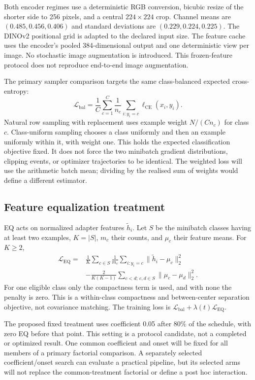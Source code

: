 \documentclass[conference]{IEEEtran}
\newcommand{\CE}{\mathrm{CE}}
\newcommand{\EQ}{\mathrm{EQ}}
\begin{document}
Both encoder regimes use a deterministic RGB conversion, bicubic resize of the shorter side to 256 pixels, and a central $224\times224$ crop. Channel means are $(0.485,0.456,0.406)$ and standard deviations are $(0.229,0.224,0.225)$. The DINOv2 positional grid is adapted to the declared input size. The feature cache uses the encoder's pooled 384-dimensional output and one deterministic view per image. No stochastic image augmentation is introduced. This frozen-feature protocol does not reproduce end-to-end image augmentation.

The primary sampler comparison targets the same class-balanced expected cross-entropy:
\begin{equation}
\mathcal L_{\mathrm{bal}}=\frac{1}{C}\sum_{c=1}^{C}\frac{1}{n_c}\sum_{i:y_i=c}\ell_{\CE}(x_i,y_i).
\label{eq:balanced}
\end{equation}
Natural row sampling with replacement uses example weight $N/(Cn_c)$ for class $c$. Class-uniform sampling chooses a class uniformly and then an example uniformly within it, with weight one. This holds the expected classification objective fixed. It does not force the two minibatch gradient distributions, clipping events, or optimizer trajectories to be identical. The weighted loss will use the arithmetic batch mean; dividing by the realised sum of weights would define a different estimator.

\subsection{Feature equalization treatment}
EQ acts on normalized adapter features $\tilde h_i$. Let $S$ be the minibatch classes having at least two examples, $K=|S|$, $m_c$ their counts, and $\mu_c$ their feature means. For $K\geq2$,
\begin{equation}
\begin{aligned}
\mathcal L_{\EQ}={}&\frac{1}{K}\sum_{c\in S}\frac{1}{m_c}\sum_{i:y_i=c}\|\tilde h_i-\mu_c\|_2^2\\
&-\frac{2}{K(K-1)}\sum_{c<d;\,c,d\in S}\|\mu_c-\mu_d\|_2^2.
\end{aligned}
\label{eq:equalization}
\end{equation}
For one eligible class only the compactness term is used, and with none the penalty is zero. This is a within-class compactness and between-center separation objective, not covariance matching. The training loss is $\mathcal L_{\mathrm{bal}}+\lambda(t)\mathcal L_{\EQ}$.

The proposed fixed treatment uses coefficient 0.05 after 80\% of the schedule, with zero EQ before that point. This setting is a protocol candidate, not a completed or optimized result. One common coefficient and onset will be fixed for all members of a primary factorial comparison. A separately selected coefficient/onset search can evaluate a practical pipeline, but its selected arms will not replace the common-treatment factorial or define a post hoc interaction.
\end{document}
